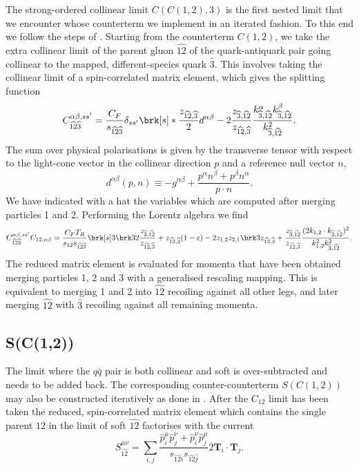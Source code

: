 \documentclass[11pt,a4paper]{article}
\newcommand{\eps}[0]{\epsilon}
\newcommand{\colorT}[1]{\mathbf{T}_{#1}}
\newcommand{\mgd}[1]{\widehat{#1}}
\begin{document}
The strong-ordered collinear limit $C(C(1,2),3)$ is the first nested limit
that we encounter whose counterterm we implement in an iterated fashion.
To this end we follow the steps of \cite{Somogyi:2006da}.
Starting from the counterterm $C(1,2)$, we take the extra collinear limit
of the parent gluon $\mgd{12}$ of the quark-antiquark pair
going collinear to the mapped, different-species quark $\mgd{3}$.
This involves taking the collinear limit of a spin-correlated matrix element,
which gives the splitting function
\begin{equation}
	C_{\mgd{12}\mgd{3}}^{\alpha\beta,ss'} = \frac{C_F}{s_{\mgd{12}\mgd{3}}}
	\delta_{ss'} \brk[s]*{
		\frac{z_{\mgd{12},\mgd{3}}}{2} d^{\alpha\beta}
		- 2 \frac{z_{\mgd{3},\mgd{12}}}{z_{\mgd{12},\mgd{3}}}
		\frac{k_{\mgd{3},\mgd{12}}^\alpha k_{\mgd{3},\mgd{12}}^\beta}
		{k_{\mgd{3},\mgd{12}}^2}
	}.
\end{equation}
The sum over physical polarisations is given by the transverse tensor
with respect to the light-cone vector in the collinear direction $p$
and a reference null vector $n$,
\begin{equation}
	d^{\alpha\beta}(p, n) \equiv
	-g^{\alpha\beta}
	+ \frac{p^\alpha n^\beta + p^\beta n^\alpha}{p \cdot n}.
\end{equation}
We have indicated with a hat the variables which are computed
after merging particles 1 and 2.
Performing the Lorentz algebra we find
\begin{equation}
	C_{\mgd{12}\mgd{3}}^{\alpha\beta,ss'} C_{12,\alpha\beta}
	= \frac{C_FT_R}{s_{12}s_{\mgd{12}\mgd{3}}} \brk[s]3{
		\brk3{
			2 \frac{z_{\mgd{3},\mgd{12}}}{z_{\mgd{12},\mgd{3}}}+
			z_{\mgd{12},\mgd{3}} (1 - \eps)
		} - 2 z_{1,2} z_{2,1} \brk3{
			z_{\mgd{12},\mgd{3}} +
			\frac{z_{\mgd{3},\mgd{12}}}{z_{\mgd{12},\mgd{3}}}
			\frac{(2k_{1,2}\cdot k_{\mgd{3},\mgd{12}})^2}
			{k_{1,2}^2 k_{\mgd{3},\mgd{12}}^2}
		}
	}.
\end{equation}
The reduced matrix element is evaluated for momenta that have been obtained
merging particles 1, 2 and 3 with a generalised rescaling mapping.
This is equivalent to merging 1 and 2 into $\mgd{12}$
recoiling against all other legs,
and later merging $\mgd{12}$ with $\mgd{3}$
recoiling against all remaining momenta.


\subsection{S(C(1,2))}

The limit where the $q\bar{q}$ pair is both collinear and soft is over-subtracted
and needs to be added back.
The corresponding counter-counterterm $S(C(1,2))$
may also be constructed iteratively as done in \cite{Somogyi:2005xz}.
After the $C_{12}$ limit has been taken the reduced, spin-correlated matrix element 
which contains the single parent $\mgd{12}$ in the limit of soft $\mgd{12}$
factorises with the current
\begin{equation}
	S_{\mgd{12}}^{\mu\nu}
	= \sum_{i, j}
	\frac{\mgd{p}_i^\mu \mgd{p}_j^\nu + \mgd{p}_i^\nu \mgd{p}_j^\mu}
	{s_{\mgd{12}\mgd{i}} s_{\mgd{12}\mgd{j}}}
	2\colorT{i}\cdot\colorT{j}.
\end{equation}
\end{document}
